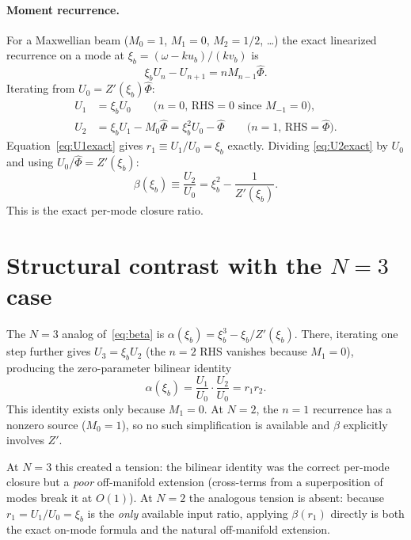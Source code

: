 \documentclass[11pt]{article}
\newcommand{\Phih}{\hat{\Phi}}
\newcommand{\xib}{\xi_b}
\newcommand{\ub}{u_b}
\newcommand{\vb}{v_b}
\begin{document}
\paragraph{Moment recurrence.}
For a Maxwellian beam ($M_0=1$, $M_1=0$, $M_2=1/2$, \ldots) the exact
linearized recurrence on a mode at $\xib = (\omega-k\ub)/(k\vb)$ is
\begin{equation}\label{eq:rec}
  \xib U_n - U_{n+1} = n M_{n-1}\Phih.
\end{equation}
Iterating from $U_0 = Z'(\xib)\Phih$:
\begin{align}
  U_1 &= \xib U_0 \qquad\text{(}n=0\text{, RHS}=0\text{ since }
         M_{-1} = 0\text{)},\label{eq:U1exact}\\
  U_2 &= \xib U_1 - M_0\Phih = \xib^2 U_0 - \Phih
         \qquad\text{(}n=1\text{, RHS}=\Phih\text{)}.
         \label{eq:U2exact}
\end{align}
Equation~\eqref{eq:U1exact} gives $r_1 \equiv U_1/U_0 = \xib$ exactly.
Dividing \eqref{eq:U2exact} by $U_0$ and using $U_0/\Phih = Z'(\xib)$:
\begin{equation}\label{eq:beta}
  \boxed{\beta(\xib) \equiv \frac{U_2}{U_0}
         = \xib^2 - \frac{1}{Z'(\xib)}.}
\end{equation}
This is the exact per-mode closure ratio.

\section{Structural contrast with the \texorpdfstring{$N=3$}{N=3} case}

The $N=3$ analog of~\eqref{eq:beta} is $\alpha(\xib) = \xib^3 -
\xib/Z'(\xib)$.  There, iterating one step further gives
$U_3 = \xib U_2$ (the $n=2$ RHS vanishes because $M_1=0$), producing
the zero-parameter bilinear identity
\begin{equation}\label{eq:bilinear}
  \alpha(\xib)
  = \frac{U_1}{U_0}\cdot\frac{U_2}{U_0}
  = r_1 r_2.
\end{equation}
This identity exists only because $M_1 = 0$.  At $N=2$, the $n=1$
recurrence has a nonzero source ($M_0 = 1$), so no such simplification
is available and $\beta$ explicitly involves $Z'$.

At $N=3$ this created a tension: the bilinear identity was the correct
per-mode closure but a \emph{poor} off-manifold extension (cross-terms
from a superposition of modes break it at $O(1)$).  At $N=2$ the
analogous tension is absent: because $r_1 = U_1/U_0 = \xib$ is the
\emph{only} available input ratio, applying $\beta(r_1)$ directly is
both the exact on-mode formula and the natural off-manifold extension.
\end{document}
